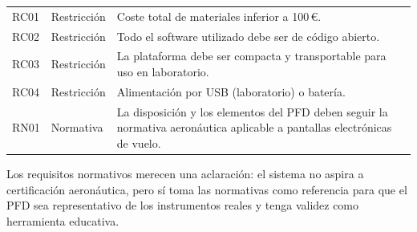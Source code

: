 \begin{xltabular}{\textwidth}{l l X}
RC01 & Restricción & Coste total de materiales inferior a 100\,€. \\
RC02 & Restricción & Todo el software utilizado debe ser de código abierto. \\
RC03 & Restricción & La plataforma debe ser compacta y transportable para uso en laboratorio. \\
RC04 & Restricción & Alimentación por USB (laboratorio) o batería. \\
\midrule

RN01 & Normativa & La disposición y los elementos del PFD deben seguir la normativa aeronáutica aplicable a pantallas electrónicas de vuelo. \\

\end{xltabular}

Los requisitos normativos merecen una aclaración: el sistema no aspira a certificación aeronáutica, pero sí toma las normativas como referencia para que el PFD sea representativo de los instrumentos reales y tenga validez como herramienta educativa.